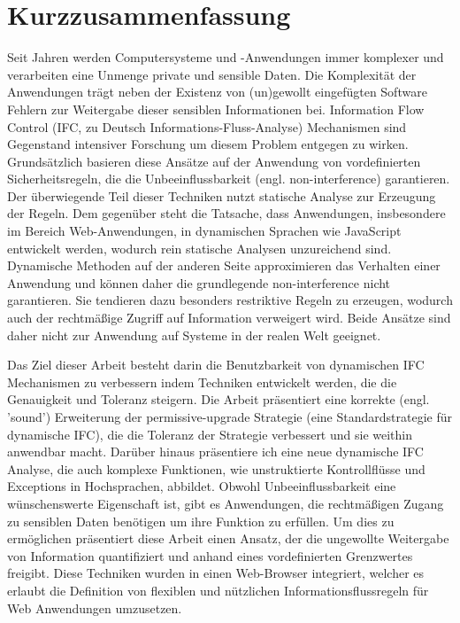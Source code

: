 \section*{Kurzzusammenfassung}

Seit Jahren werden Computersysteme und -Anwendungen immer komplexer
und verarbeiten eine Unmenge private und sensible Daten. Die
Komplexit\"at der Anwendungen tr\"agt neben der Existenz von (un)gewollt
eingef\"ugten Software Fehlern zur Weitergabe dieser sensiblen
Informationen bei. Information Flow Control (IFC, zu Deutsch
Informations-Fluss-Analyse) Mechanismen sind Gegenstand intensiver
Forschung um diesem Problem entgegen zu wirken. Grunds\"atzlich basieren
diese Ans\"atze auf der Anwendung von vordefinierten Sicherheitsregeln,
die die Unbeeinflussbarkeit (engl. non-interference) garantieren. Der
\"uberwiegende Teil dieser Techniken nutzt statische Analyse zur
Erzeugung der Regeln. Dem gegen\"uber steht die Tatsache, dass
Anwendungen, insbesondere im Bereich Web-Anwendungen, in dynamischen
Sprachen wie JavaScript entwickelt werden, wodurch rein statische
Analysen unzureichend sind. Dynamische Methoden auf der anderen Seite
approximieren das Verhalten einer Anwendung und k\"onnen daher die
grundlegende non-interference nicht garantieren. Sie tendieren dazu
besonders restriktive Regeln zu erzeugen, wodurch auch der rechtm{\"a}{\ss}ige
Zugriff auf Information verweigert wird. Beide Ans\"atze sind daher
nicht zur Anwendung auf Systeme in der realen Welt geeignet.

Das Ziel dieser Arbeit besteht darin die Benutzbarkeit von dynamischen
IFC Mechanismen zu verbessern indem Techniken entwickelt werden, die
die Genauigkeit und Toleranz steigern. Die Arbeit pr\"asentiert eine
korrekte (engl. 'sound') Erweiterung der permissive-upgrade Strategie
(eine Standardstrategie f\"ur dynamische IFC), die die Toleranz der
Strategie verbessert und sie weithin anwendbar macht. Dar\"uber hinaus
pr\"asentiere ich eine neue dynamische IFC Analyse, die auch komplexe
Funktionen, wie unstruktierte Kontrollfl\"usse und Exceptions in
Hochsprachen, abbildet. Obwohl Unbeeinflussbarkeit eine w\"unschenswerte
Eigenschaft ist, gibt es Anwendungen, die rechtm{\"a}{\ss}igen Zugang zu
sensiblen Daten ben\"otigen um ihre Funktion zu erf\"ullen. Um dies zu
erm\"oglichen pr\"asentiert diese Arbeit einen Ansatz, der die ungewollte
Weitergabe von Information quantifiziert und anhand eines
vordefinierten Grenzwertes freigibt. Diese Techniken wurden in einen
Web-Browser integriert, welcher es erlaubt die Definition von
flexiblen und n\"utzlichen Informationsflussregeln f\"ur Web Anwendungen
umzusetzen. 